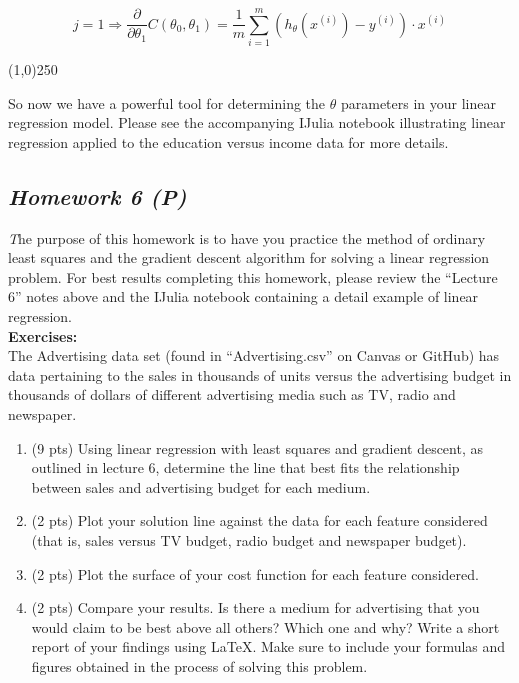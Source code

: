 \documentclass[11pt,a4paper,oneside]{report}
\begin{document}
\[
j = 1 \Rightarrow \frac{\partial}{\partial \theta_1}C(\theta_0,\theta_1) = \frac{1}{m}\sum\limits_{i=1}^m(h_{\theta}(x^{(i)})-y^{(i)})\cdot x^{(i)}
\]

\begin{center}
\line(1,0){250}
\end{center}

So now we have a powerful tool for determining the $\theta$ parameters in your linear regression model. Please see the accompanying IJulia notebook illustrating linear regression applied to the education versus income data for more details. \\
\newpage

{\center\color{magenta}
\subsection*{\it\huge Homework 6 (P)}}

{\it\huge T}he purpose of this homework is to have you practice the method of ordinary least squares and the gradient descent algorithm for solving a linear regression problem. For best results completing this homework, please review the ``Lecture 6'' notes above and the IJulia notebook containing a detail example of linear regression.\\

{\bf Exercises:}\\

The Advertising data set (found in ``Advertising.csv'' on Canvas or GitHub) has data pertaining to the sales in thousands of units versus the advertising budget in thousands of dollars of different advertising media such as TV, radio and newspaper.\\
\begin{enumerate}
\item (9 pts) Using linear regression with least squares and gradient descent, as outlined in lecture 6,  determine the line that best fits the relationship between sales and advertising budget for each medium.
\item (2 pts) Plot your solution line against the data for each feature considered (that is, sales versus TV budget, radio budget and newspaper budget).
\item (2 pts) Plot the surface of your cost function for each feature considered.
\item (2 pts) Compare your results. Is there a medium for advertising that you would claim to be best above all others? Which one and why? Write a short report of your findings using \LaTeX. Make sure to include your formulas and figures obtained in the process of solving this problem.
\end{enumerate}
\end{document}
